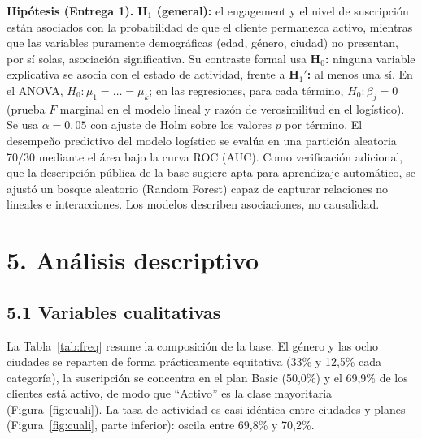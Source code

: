 \documentclass[a4,11pt]{aleph-notas}
\begin{document}
\textbf{Hipótesis (Entrega 1).} \textbf{H$_1$ (general):} el engagement y el nivel de suscripción están asociados con la probabilidad de que el cliente permanezca activo, mientras que las variables puramente demográficas (edad, género, ciudad) no presentan, por sí solas, asociación significativa. Su contraste formal usa \textbf{H$_0$:} ninguna variable explicativa se asocia con el estado de actividad, frente a \textbf{H$_1'$:} al menos una sí. En el ANOVA, $H_0:\mu_1=\dots=\mu_k$; en las regresiones, para cada término, $H_0:\beta_j=0$ (prueba $F$ marginal en el modelo lineal y razón de verosimilitud en el logístico). Se usa $\alpha=0{,}05$ con ajuste de Holm sobre los valores $p$ por término. El desempeño predictivo del modelo logístico se evalúa en una partición aleatoria 70/30 mediante el área bajo la curva ROC (AUC). Como verificación adicional, que la descripción pública de la base sugiere apta para aprendizaje automático, se ajustó un bosque aleatorio (Random Forest) capaz de capturar relaciones no lineales e interacciones. Los modelos describen asociaciones, no causalidad.

\section*{5. Análisis descriptivo}

\subsection*{5.1 Variables cualitativas}
La Tabla~\ref{tab:freq} resume la composición de la base. El género y las ocho ciudades se reparten de forma prácticamente equitativa (33\% y 12,5\% cada categoría), la suscripción se concentra en el plan Basic (50,0\%) y el 69,9\% de los clientes está activo, de modo que ``Activo'' es la clase mayoritaria (Figura~\ref{fig:cuali}). La tasa de actividad es casi idéntica entre ciudades y planes (Figura~\ref{fig:cuali}, parte inferior): oscila entre 69,8\% y 70,2\%.
\end{document}
